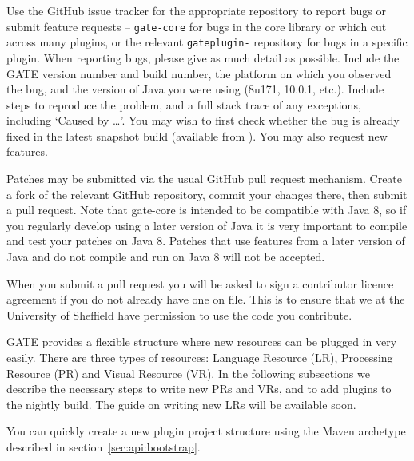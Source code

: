 Use the GitHub issue tracker for the appropriate repository to report bugs or
submit feature requests -- \verb!gate-core! for bugs in the core library or
which cut across many plugins, or the relevant \verb!gateplugin-! repository
for bugs in a specific plugin.  When reporting bugs, please give as much detail
as possible. Include the GATE version number and build number, the platform on
which you observed the bug, and the version of Java you were using (8u171,
10.0.1, etc.). Include steps to reproduce the problem, and a full stack trace
of any exceptions, including `Caused by \ldots'. You may wish to first check
whether the bug is already fixed in the latest snapshot build (available from
). You may also
request new features.


Patches may be submitted via the usual GitHub pull request mechanism. Create a
fork of the relevant GitHub repository, commit your changes there, then submit
a pull request.  Note that gate-core is intended to be compatible with Java 8,
so if you regularly develop using a later version of Java it is very important
to compile and test your patches on Java 8.  Patches that use features from a
later version of Java and do not compile and run on Java 8 will not be
accepted.

When you submit a pull request you will be asked to sign a contributor licence
agreement if you do not already have one on file.  This is to ensure that we at
the University of Sheffield have permission to use the code you contribute.


GATE provides a flexible structure where new resources can be plugged in very
easily. There are three types of resources: Language Resource (LR), Processing
Resource (PR) and Visual Resource (VR). In the following subsections we describe
the necessary steps to write new PRs and VRs, and to add plugins to the nightly
build. The guide on writing new LRs will be available soon.

You can quickly create a new plugin project structure using the Maven archetype
described in section~\ref{sec:api:bootstrap}.

